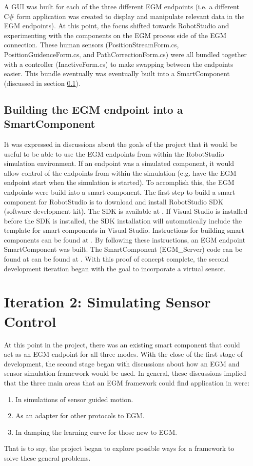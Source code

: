 \documentclass{cslthse-msc}
\begin{document}
A GUI was built for each of the three different EGM endpoints (i.e. a different C\# form application was created to display and manipulate relevant data in the EGM endpoints). At this point, the focus shifted towards RobotStudio and experimenting with the components on the EGM process side of the EGM connection. These human sensors (PositionStreamForm.cs, PositionGuidenceForm.cs, and PathCorrectionForm.cs) were all bundled together with a controller (InactiveForm.cs) to make swapping between the endpoints easier. This bundle eventually was eventually built into a SmartComponent (discussed in section \ref{sec:Dev:I1:smart_comp}).



\subsection{Building the EGM endpoint into a SmartComponent}
\label{sec:Dev:I1:smart_comp}
It was expressed in discussions about the goals of the project that it would be useful to be able to use the EGM endpoints from within the RobotStudio simulation environment. If an endpoint was a simulated component, it would allow control of the endpoints from within the simulation (e.g. have the EGM endpoint start when the simulation is started). To accomplish this, the EGM endpoints were build into a smart component. The first step to build a smart component for RobotStudio is to download and install RobotStudio SDK (software development kit). The SDK is available at \cite{ABB:RS_SDK}. If Visual Studio is installed before the SDK is installed, the SDK installation will automatically include the template for smart components in Visual Studio. Instructions for building smart components can be found at \cite{ABB:Smart_Components}. By following these instructions, an EGM endpoint SmartComponent was built. The SmartComponent (EGM\_Server) code can be found at can be found at \cite{Greg:Sensor}. With this proof of concept complete, the second development iteration began with the goal to incorporate a virtual sensor.


\section{Iteration 2: Simulating Sensor Control}
\label{sec:Dev:I2}
At this point in the project, there was an existing smart component that could act as an EGM endpoint for all three modes. With the close of the first stage of development, the second stage began with discussions about how an EGM and sensor simulation framework would be used. In general, these discussions implied that the three main areas that an EGM framework could find application in were:
\begin{enumerate}
    \item In simulations of sensor guided motion.
    \item As an adapter for other protocols to EGM.
    \item In damping the learning curve for those new to EGM. 
\end{enumerate}
That is to say, the project began to explore possible ways for a framework to solve these general problems. 
\end{document}
